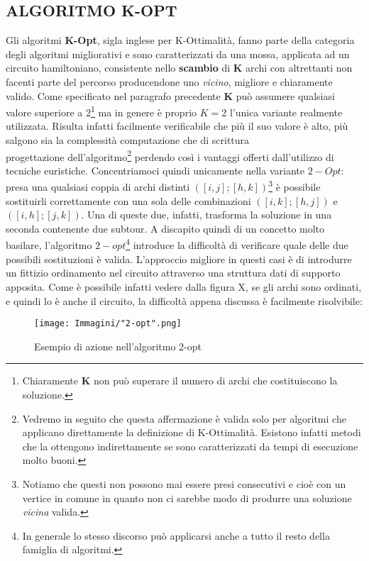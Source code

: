 \documentclass[11pt]{article}
\begin{document}
\subsection*{ALGORITMO K-OPT}

Gli algoritmi \textbf{K-Opt}, sigla inglese per K-Ottimalità, fanno parte della categoria degli algoritmi migliorativi e sono caratterizzati da una mossa, applicata ad un circuito hamiltoniano, consistente nello \textbf{scambio} di \textbf{K} archi con altrettanti non facenti parte del percorso producendone uno \textit{vicino}, migliore e chiaramente valido.
Come specificato nel paragrafo precedente \textbf{K} può assumere qualsiasi valore superiore a $2$\footnote{Chiaramente \textbf{K} non può superare il numero di archi che costituiscono la soluzione.} ma in genere è proprio $K = 2$ l'unica variante realmente utilizzata. Risulta infatti facilmente verificabile che più il suo valore è alto, più salgono sia la complessità computazione che di scrittura\\progettazione dell'algoritmo\footnote{Vedremo in seguito che questa affermazione è valida solo per algoritmi che applicano direttamente la definizione di K-Ottimalità. Esistono infatti metodi che la ottengono indirettamente se sono caratterizzati da tempi di esecuzione molto buoni.} perdendo così i vantaggi offerti dall'utilizzo di tecniche euristiche.
Concentriamoci quindi unicamente nella variante $2-Opt$: presa una qualsiasi coppia di archi distinti $([i,j];[h,k])$\footnote{Notiamo che questi non possono mai essere presi consecutivi e cioè con un vertice in comune in quanto non ci sarebbe modo di produrre una soluzione \textit{vicina} valida.} è possibile sostituirli correttamente con una sola delle combinazioni $([i,k];[h,j])$ e $([i,h];[j,k])$. Una di queste due, infatti, trasforma la soluzione in una seconda contenente due subtour.
A discapito quindi di un concetto molto basilare, l'algoritmo $2-opt$\footnote{In generale lo stesso discorso può applicarsi anche a tutto il resto della famiglia di algoritmi.} introduce la difficoltà di verificare quale delle due possibili sostituzioni è valida. L'approccio migliore in questi casi è di introdurre un fittizio ordinamento nel circuito attraverso una struttura dati di supporto apposita. Come è possibile infatti vedere dalla figura X, se gli archi sono ordinati, e quindi lo è anche il circuito, la difficoltà appena discussa è facilmente risolvibile: 

\begin{figure}[htbp]
    \centering
    \texttt{[image: Immagini/"2-opt".png]}
    \caption{Esempio di azione nell'algoritmo 2-opt}
\end{figure}
\end{document}
